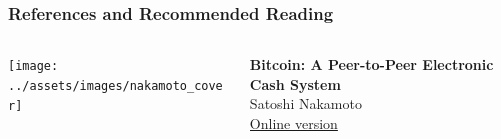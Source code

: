 \documentclass[handout]{beamer}
\begin{document}
\begin{frame}%
\frametitle{References and Recommended Reading}

		\begin{columns}[T]
			\begin{column}{0.1\textwidth}
					\texttt{[image: ../assets/images/nakamoto\_cover]}
			\end{column} %
			\begin{column}{0.8\textwidth}
				\textbf{Bitcoin: A Peer-to-Peer Electronic Cash System} \\ 
				Satoshi Nakamoto \\
				\link \href{https://bitcoin.org/bitcoin.pdf}{Online version}
			\end{column}
		\end{columns}
	\vspace{1.5em}
	\vspace{1.5em}
	

\end{frame}
\end{document}
